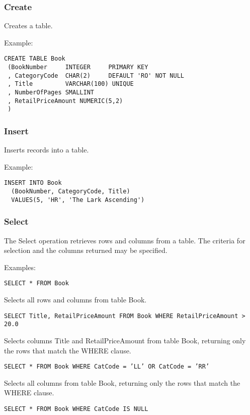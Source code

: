 

\subsubsection{Create}

Creates a table.

Example:

\begin{verbatim}
CREATE TABLE Book
 (BookNumber     INTEGER     PRIMARY KEY
 , CategoryCode  CHAR(2)     DEFAULT 'RO' NOT NULL
 , Title         VARCHAR(100) UNIQUE
 , NumberOfPages SMALLINT
 , RetailPriceAmount NUMERIC(5,2)
 )
\end{verbatim}

\subsubsection{Insert}

Inserts records into a table.

Example:

\begin{verbatim}
INSERT INTO Book
  (BookNumber, CategoryCode, Title)
  VALUES(5, 'HR', 'The Lark Ascending')
\end{verbatim}

\subsubsection{Select}

The Select operation retrieves rows and columns from a table. The criteria
for selection and the columns returned may be specified.

Examples:

{\tt SELECT * FROM Book}

Selects all rows and columns from table Book.

{\tt SELECT Title, RetailPriceAmount FROM Book WHERE RetailPriceAmount > 20.0}

Selects columns Title and RetailPriceAmount from table Book, returning only
the rows that match the WHERE clause.

{\tt SELECT * FROM Book WHERE CatCode = 'LL' OR CatCode = 'RR'}

Selects all columns from table Book, returning only
the rows that match the WHERE clause.

{\tt SELECT * FROM Book WHERE CatCode IS NULL}

